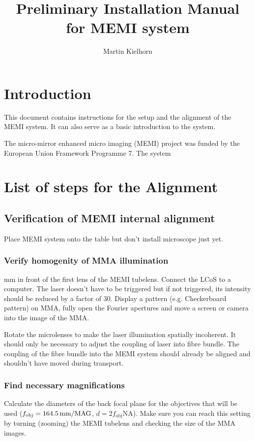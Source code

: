 \documentclass{scrartcl}
\title{Preliminary Installation Manual for MEMI system}
\author{Martin Kielhorn}
\begin{document}
\maketitle
\section{Introduction}
This document contains instructions for the setup and the alignment of
the MEMI system. It can also serve as a basic introduction to the
system.

The micro-mirror enhanced micro imaging (MEMI) project was funded by the
European Union Framework Programme 7. The system 

\section{List of steps for the Alignment}
\newcommand{\q}[1]{\subsection{#1}} 
\newcommand{\qq}[1]{\subsubsection{#1}} 

\q{Verification of MEMI internal alignment} Place MEMI system onto the
table but don't install microscope just yet.  

\qq{Verify homogenity of MMA illumination} \unit[250]{mm} in front of
the first lens of the MEMI tubelens. Connect the LCoS to a
computer. The laser doesn't have to be triggered but if not triggered,
its intensity should be reduced by a factor of 30. Display a pattern
(e.g. Checkerboard pattern) on MMA, fully open the Fourier apertures
and move a screen or camera into the image of the MMA.

Rotate the microlenses to make the laser illumination spatially
incoherent. It should only be necessary to adjust the coupling of
laser into fibre bundle. The coupling of the fibre bundle into the
MEMI system should already be aligned and shouldn't have moved during
transport.

\qq{Find necessary magnifications} Calculate the diameters of the back
focal plane for the objectives that will be used
($f_\textrm{obj}=\unit[164.5]{mm}/\textrm{MAG}$, $d=2 f_\textrm{obj}
\textrm{NA}$). Make sure you can reach this setting by turning
(zooming) the MEMI tubelens and checking the size of the MMA images.
\end{document}
